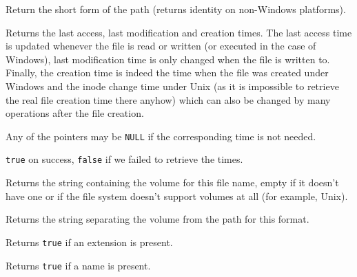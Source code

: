 
Return the short form of the path (returns identity on non-Windows platforms).


\label{wxfilenamegettimes}


Returns the last access, last modification and creation times. The last access
time is updated whenever the file is read or written (or executed in the case
of Windows), last modification time is only changed when the file is written
to. Finally, the creation time is indeed the time when the file was created
under Windows and the inode change time under Unix (as it is impossible to
retrieve the real file creation time there anyhow) which can also be changed
by many operations after the file creation.

Any of the pointers may be {\tt NULL} if the corresponding time is not
needed.


{\tt true} on success, {\tt false} if we failed to retrieve the times.


\label{wxfilenamegetvolume}


Returns the string containing the volume for this file name, empty if it
doesn't have one or if the file system doesn't support volumes at all (for
example, Unix).


\label{wxfilenamegetvolumeseparator}


Returns the string separating the volume from the path for this format.


\label{wxfilenamehasext}


Returns {\tt true} if an extension is present.


\label{wxfilenamehasname}


Returns {\tt true} if a name is present.


\label{wxfilenamehasvolume}

